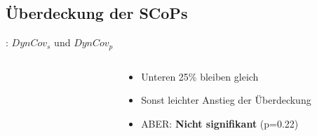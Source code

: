\documentclass[aspectratio=169, xcolor=dvipsnames]{beamer}
\begin{document}
\subsection{Überdeckung der SCoPs}
\begin{frame}{\subsecname: \(DynCov_s\) und \(DynCov_p\)}
    \vspace{-1cm}
    \begin{columns}
        \begin{column}{5cm}
            \begin{figure}[!h]
                
            \end{figure}
        \end{column}
        \begin{column}{5cm}
            \begin{itemize}[<+(1)->]
                \item Unteren 25\% bleiben gleich
                \item Sonst leichter Anstieg der Überdeckung
                \item ABER: \textbf{Nicht signifikant} (p=0.22)
            \end{itemize}
        \end{column}
    \end{columns}
\end{frame}
\end{document}
